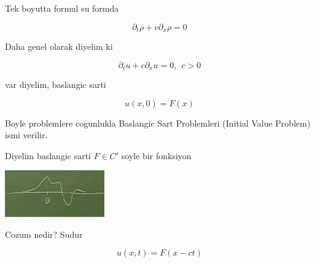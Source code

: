 \documentclass[12pt,fleqn]{article}\usepackage{../common}
\begin{document}
Tek boyutta formul su formda

\[ \partial_t \rho + v \partial_x \rho = 0 \]

Daha genel olarak diyelim ki 

\[ \partial_t u + c\partial_x u = 0, \ \ c>0 \]

var diyelim, baslangic sarti

\[ u(x,0) = F(x) \]

Boyle problemlere cogunlukla Baslangic Sart Problemleri (Initial Value
Problem) ismi verilir. 

Diyelim baslangic sarti $F \in C'$  soyle bir fonksiyon

\includegraphics[height=2cm]{1_3.png}

Cozum nedir? Sudur 

\[ u(x,t) = F(x-ct) \]
\end{document}
